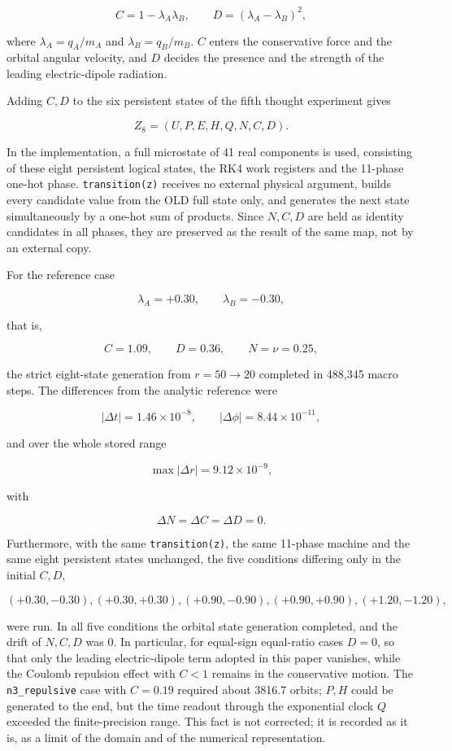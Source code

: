 \documentclass[
  a4paper,
]{article}
\begin{document}
\[
C=1-\lambda_A\lambda_B,
\qquad
D=(\lambda_A-\lambda_B)^2,
\]

where \(\lambda_A=q_A/m_A\) and \(\lambda_B=q_B/m_B\). \(C\) enters the
conservative force and the orbital angular velocity, and \(D\) decides
the presence and the strength of the leading electric-dipole radiation.

Adding \(C,D\) to the six persistent states of the fifth thought
experiment gives

\[
\boxed{
Z_8=(U,P,E,H,Q,N,C,D).
}
\]

In the implementation, a full microstate of 41 real components is used,
consisting of these eight persistent logical states, the RK4 work
registers and the 11-phase one-hot phase. \texttt{transition(z)}
receives no external physical argument, builds every candidate value
from the OLD full state only, and generates the next state
simultaneously by a one-hot sum of products. Since \(N,C,D\) are held as
identity candidates in all phases, they are preserved as the result of
the same map, not by an external copy.

For the reference case

\[
\lambda_A=+0.30,
\qquad
\lambda_B=-0.30,
\]

that is,

\[
C=1.09,
\qquad
D=0.36,
\qquad
N=\nu=0.25,
\]

the strict eight-state generation from \(r=50\rightarrow20\) completed
in 488,345 macro steps. The differences from the analytic reference were

\[
|\Delta t|=1.46\times10^{-8},
\qquad
|\Delta\phi|=8.44\times10^{-11},
\]

and over the whole stored range

\[
\max|\Delta r|=9.12\times10^{-9},
\]

with

\[
\Delta N=\Delta C=\Delta D=0.
\]

Furthermore, with the same \texttt{transition(z)}, the same 11-phase
machine and the same eight persistent states unchanged, the five
conditions differing only in the initial \(C,D\),

\[
(+0.30,-0.30),
(+0.30,+0.30),
(+0.90,-0.90),
(+0.90,+0.90),
(+1.20,-1.20),
\]

were run. In all five conditions the orbital state generation completed,
and the drift of \(N,C,D\) was 0. In particular, for equal-sign
equal-ratio cases \(D=0\), so that only the leading electric-dipole term
adopted in this paper vanishes, while the Coulomb repulsion effect with
\(C<1\) remains in the conservative motion. The \texttt{n3\_repulsive}
case with \(C=0.19\) required about 3816.7 orbits; \(P,H\) could be
generated to the end, but the time readout through the exponential clock
\(Q\) exceeded the finite-precision range. This fact is not corrected;
it is recorded as it is, as a limit of the domain and of the numerical
representation.
\end{document}
